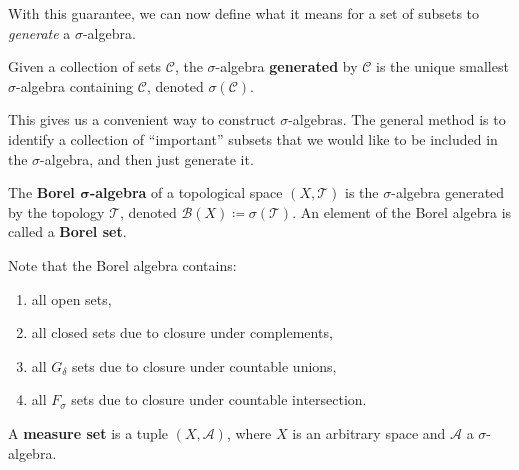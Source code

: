   With this guarantee, we can now define what it means for a set of subsets to \textit{generate} a $\sigma$-algebra. 

  \begin{definition}
    Given a collection of sets $\mathscr{C}$, the $\sigma$-algebra \textbf{generated} by $\mathscr{C}$ is the unique smallest $\sigma$-algebra containing $\mathscr{C}$, denoted $\sigma(\mathscr{C})$. 
  \end{definition} 

  This gives us a convenient way to construct $\sigma$-algebras. The general method is to identify a collection of ``important'' subsets that we would like to be included in the $\sigma$-algebra, and then just generate it.   

  \begin{definition}
    The \textbf{Borel $\boldsymbol{\sigma}$-algebra} of a topological space $(X, \mathscr{T})$ is the $\sigma$-algebra generated by the topology $\mathscr{T}$, denoted $\mathcal{B}(X) \coloneqq \sigma(\mathscr{T})$. An element of the Borel algebra is called a \textbf{Borel set}. 
  \end{definition}

  Note that the Borel algebra contains: 
  \begin{enumerate}
    \item all open sets, 
    \item all closed sets due to closure under complements, 
    \item all $G_\delta$ sets due to closure under countable unions, 
    \item all $F_\sigma$ sets due to closure under countable intersection. 
  \end{enumerate}

  \begin{definition}
    A \textbf{measure set} is a tuple $(X, \mathcal{A})$, where $X$ is an arbitrary space and $\mathcal{A}$ a $\sigma$-algebra. 
  \end{definition}

